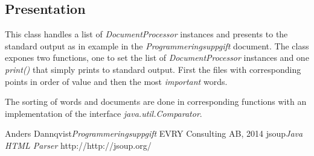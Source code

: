 \documentclass[a4paper]{article}
\begin{document}
\subsection{Presentation}
This class handles a list of \textit{DocumentProcessor} instances and presents to the standard output as in example in the \textit{Programmeringsuppgift} document. The class expones two functions, one to set the list of \textit{DocumentProcessor} instances and one \textit{print()} that simply prints to standard output. First the files with corresponding points in order of value and then the most \textit{important} words.

The sorting of words and documents are done in corresponding functions with an implementation of the interface \textit{java.util.Comparator}.

\newpage

\begin{thebibliography}{99}
	Anders Dannqvist\emph{Programmeringsuppgift} EVRY Consulting AB, 2014
	jsoup\emph{Java HTML Parser} http://http://jsoup.org/
\end{thebibliography}
\end{document}
